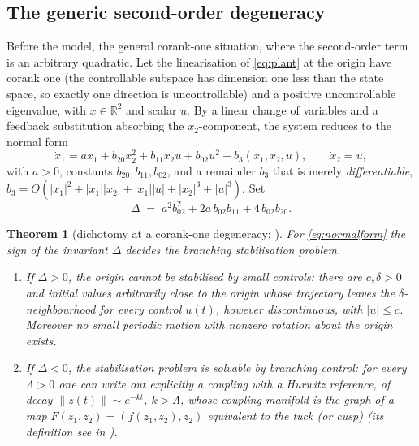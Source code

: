 \documentclass[11pt,reqno]{amsart}
\theoremstyle{plain}
\newtheorem*{theorem}{Theorem}
\theoremstyle{definition}
\theoremstyle{remark}
\newcommand{\R}{\mathbb{R}}
\begin{document}
\subsection{The generic second-order degeneracy}\label{sec:generic-quadratic}
Before the model, the general corank-one situation, where the second-order term is
an arbitrary quadratic. Let the linearisation of \eqref{eq:plant} at the origin
have corank one (the controllable subspace has dimension one less than the state space, so exactly one direction is uncontrollable) and a positive uncontrollable eigenvalue, with $x\in\R^{2}$ and scalar $u$. By a linear change of variables
and a feedback substitution absorbing the $\dot x_2$-component, the system reduces
to the normal form \cite[\S4.2]{Shosh1990}
\begin{equation}\label{eq:normalform}
  \dot x_1 = a x_1 + b_{20}x_2^{2} + b_{11}x_2u + b_{02}u^{2} + b_3(x_1,x_2,u),
  \qquad \dot x_2 = u,
\end{equation}
with $a>0$, constants $b_{20},b_{11},b_{02}$, and a remainder $b_3$ that is merely
\emph{differentiable}, $b_3=O(|x_1|^{2}+|x_1||x_2|+|x_1||u|+|x_2|^{3}+|u|^{3})$. Set
\begin{equation}\label{eq:invariant}
  \Delta \;=\; a^{2}b_{02}^{2} + 2a\,b_{02}b_{11} + 4\,b_{02}b_{20}.
\end{equation}

\begin{theorem}[dichotomy at a corank-one degeneracy; {\cite[Thm.~4.2, Prop.~4.4]{Shosh1990}}]
\label{thm:dichotomy}
For \eqref{eq:normalform} the sign of the invariant $\Delta$ decides the branching stabilisation problem.
\begin{enumerate}
\item If $\Delta>0$, the origin cannot be stabilised by small controls: there are $c,\delta>0$ and
initial values arbitrarily close to the origin whose trajectory leaves the
$\delta$-neighbourhood for \emph{every} control $u(t)$, however discontinuous, with
$|u|\le c$. Moreover no small periodic motion with nonzero rotation about the
origin exists.
\item If $\Delta<0$, the stabilisation problem is solvable by branching control: for every $\Lambda>0$ one can write out explicitly
a coupling with a Hurwitz reference, of decay
$\|z(t)\|\sim e^{-kt}$, $k>\Lambda$, whose coupling manifold is the graph of a map $F(z_1,z_2)=(f(z_1,z_2),z_2)$
equivalent to the tuck (or cusp) (its definition see in \cite{AGV}).
\end{enumerate}
\end{theorem}
\end{document}
